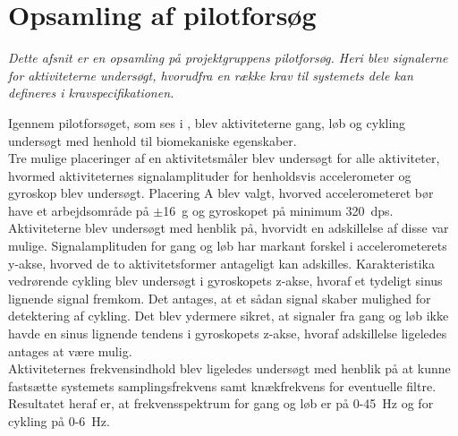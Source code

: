 \section{Opsamling af pilotforsøg}\label{opsamling_pilot}
\textit{Dette afsnit er en opsamling på projektgruppens pilotforsøg. Heri blev signalerne for aktiviteterne undersøgt, hvorudfra en række krav til systemets dele kan defineres i kravspecifikationen.}

Igennem pilotforsøget, som ses i , blev aktiviteterne gang, løb og cykling undersøgt med henhold til biomekaniske egenskaber. \\
Tre mulige placeringer af en aktivitetsmåler blev undersøgt for alle aktiviteter, hvormed aktiviteternes signalamplituder for henholdsvis accelerometer og gyroskop blev undersøgt. Placering A blev valgt, hvorved accelerometeret bør have et arbejdsområde på $\pm$16~g og gyroskopet på minimum 320~dps. \\
Aktiviteterne blev undersøgt med henblik på, hvorvidt en adskillelse af disse var mulige. Signalamplituden for gang og løb har markant forskel i accelerometerets y-akse, hvorved de to aktivitetsformer antageligt kan adskilles. Karakteristika vedrørende cykling blev undersøgt i gyroskopets z-akse, hvoraf et tydeligt sinus lignende signal fremkom. Det antages, at et sådan signal skaber mulighed for detektering af cykling. Det blev ydermere sikret, at signaler fra gang og løb ikke havde en sinus lignende tendens i gyroskopets z-akse, hvoraf adskillelse ligeledes antages at være mulig. \\
Aktiviteternes frekvensindhold blev ligeledes undersøgt med henblik på at kunne fastsætte systemets samplingsfrekvens samt knækfrekvens for eventuelle filtre. Resultatet heraf er, at frekvensspektrum for gang og løb er på 0-45~Hz og for cykling på 0-6~Hz. 

